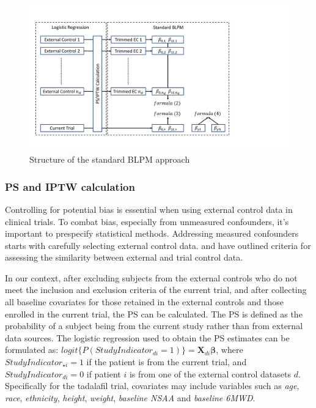 \begin{figure}
\centering
\includegraphics[width=\textwidth]{chapters/figures/flow_dissertation.pdf}
\caption{Structure of the standard BLPM approach}
\label{fig:BLPM_diagram}
\end{figure}

\subsubsection{PS and IPTW calculation} \label{sec:ps}

Controlling for potential bias is essential when using external control data in clinical trials. To combat bias, especially from unmeasured confounders, it's important to prespecify statistical methods. Addressing measured confounders starts with carefully selecting external control data. \cite{pocock1976combination} and \cite{lim2018minimizing} have outlined criteria for assessing the similarity between external and trial control data. 

In our context, after excluding subjects from the external controls who do not meet the inclusion and exclusion criteria of the current trial, and after collecting all baseline covariates for those retained in the external controls and those enrolled in the current trial, the \ac{PS} can be calculated. The \ac{PS} is defined as the probability of a subject being from the current study rather than from external data sources. The logistic regression used to obtain the \ac{PS} estimates can be formulated as: $logit\{P(StudyIndicator_{di} = 1)\}= \boldsymbol{X}_{di}\boldsymbol{\beta}$, where $StudyIndicator_{\star i} = 1$ if the patient is from the current trial, and $StudyIndicator_{di} = 0$ if patient $i$ is from one of the external control datasets $d$. Specifically for the tadalafil trial, covariates may include variables such as \textit{age}, \textit{race}, \textit{ethnicity}, \textit{height}, \textit{weight}, \textit{baseline NSAA} and \textit{baseline 6MWD}.

